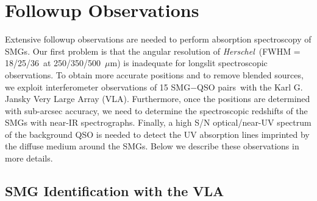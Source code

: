 \documentclass[iop,revtex4,twocolumn,apj,numberedappendix,appendixfloats]{emulateapj}
\newcommand{\hers}{{\it Herschel}}
\newcommand{\um}{$\mu$m}
\newcommand{\sqps}{SMG$-$QSO pairs}
\begin{document}
\begin{figure*}[!tb]
\caption{VLA 6~GHz continuum maps for the six VLA-identified SMGs. Each image is 30\arcsec$\times$30\arcsec\ centered on the \hers\ position. The restoring beam of each map is plotted as the red ellipse at the lower right corner. The cross and the dashed circle indicate the \hers\ positions and the 18\arcsec\ FWHM of the 250~\um\ PSF. The red square highlights the detected radio source within the \hers\ FWHM. The blue diamond marks the optical position of the QSO, if it is within the displayed region. The contours are at ($+$2, $+$4)$\times$$\sigma$. Major tickmarks are spaced in 5\arcsec\ intervals. N is up and E is left for all panels.
\label{fig:detections}} 
\end{figure*}

\section{Followup Observations} \label{sec:obs}

Extensive followup observations are needed to perform absorption spectroscopy of SMGs. Our first problem is that the angular resolution of \hers\ (FWHM = 18\arcsec/25\arcsec/36\arcsec\ at 250/350/500~\um) is inadequate for longslit spectroscopic observations.
To obtain more accurate positions and to remove blended sources, we exploit interferometer observations of 15 \sqps\ with the Karl G. Jansky Very Large Array (VLA). Furthermore, once the positions are determined with sub-arcsec accuracy, we need to determine the spectroscopic redshifts of the SMGs with near-IR spectrographs.
Finally, a high S/N optical/near-UV spectrum of the background QSO is needed to detect the UV absorption lines imprinted by the diffuse medium around the SMGs. Below we describe these observations in more details.

\subsection{SMG Identification with the VLA}

\end{document}
